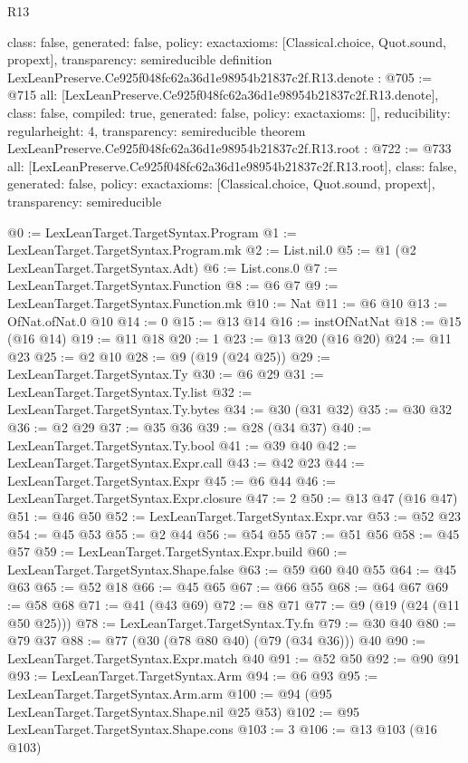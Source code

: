 \begin{lexlean}{R13}
\begin{coremodule}
{  class: false,
  generated: false,
  policy: exact{axioms: [Classical.choice, Quot.sound, propext]},
  transparency: semireducible
}
definition LexLeanPreserve.Ce925f048fc62a36d1e98954b21837c2f.R13.denote : @705 := @715 {
  all: [LexLeanPreserve.Ce925f048fc62a36d1e98954b21837c2f.R13.denote],
  class: false,
  compiled: true,
  generated: false,
  policy: exact{axioms: []},
  reducibility: regular{height: 4},
  transparency: semireducible
}
theorem LexLeanPreserve.Ce925f048fc62a36d1e98954b21837c2f.R13.root : @722 := @733 {
  all: [LexLeanPreserve.Ce925f048fc62a36d1e98954b21837c2f.R13.root],
  class: false,
  generated: false,
  policy: exact{axioms: [Classical.choice, Quot.sound, propext]},
  transparency: semireducible
}

@0 := LexLeanTarget.TargetSyntax.Program
@1 := LexLeanTarget.TargetSyntax.Program.mk
@2 := List.nil.{0}
@5 := @1 (@2 LexLeanTarget.TargetSyntax.Adt)
@6 := List.cons.{0}
@7 := LexLeanTarget.TargetSyntax.Function
@8 := @6 @7
@9 := LexLeanTarget.TargetSyntax.Function.mk
@10 := Nat
@11 := @6 @10
@13 := OfNat.ofNat.{0} @10
@14 := 0
@15 := @13 @14
@16 := instOfNatNat
@18 := @15 (@16 @14)
@19 := @11 @18
@20 := 1
@23 := @13 @20 (@16 @20)
@24 := @11 @23
@25 := @2 @10
@28 := @9 (@19 (@24 @25))
@29 := LexLeanTarget.TargetSyntax.Ty
@30 := @6 @29
@31 := LexLeanTarget.TargetSyntax.Ty.list
@32 := LexLeanTarget.TargetSyntax.Ty.bytes
@34 := @30 (@31 @32)
@35 := @30 @32
@36 := @2 @29
@37 := @35 @36
@39 := @28 (@34 @37)
@40 := LexLeanTarget.TargetSyntax.Ty.bool
@41 := @39 @40
@42 := LexLeanTarget.TargetSyntax.Expr.call
@43 := @42 @23
@44 := LexLeanTarget.TargetSyntax.Expr
@45 := @6 @44
@46 := LexLeanTarget.TargetSyntax.Expr.closure
@47 := 2
@50 := @13 @47 (@16 @47)
@51 := @46 @50
@52 := LexLeanTarget.TargetSyntax.Expr.var
@53 := @52 @23
@54 := @45 @53
@55 := @2 @44
@56 := @54 @55
@57 := @51 @56
@58 := @45 @57
@59 := LexLeanTarget.TargetSyntax.Expr.build
@60 := LexLeanTarget.TargetSyntax.Shape.false
@63 := @59 @60 @40 @55
@64 := @45 @63
@65 := @52 @18
@66 := @45 @65
@67 := @66 @55
@68 := @64 @67
@69 := @58 @68
@71 := @41 (@43 @69)
@72 := @8 @71
@77 := @9 (@19 (@24 (@11 @50 @25)))
@78 := LexLeanTarget.TargetSyntax.Ty.fn
@79 := @30 @40
@80 := @79 @37
@88 := @77 (@30 (@78 @80 @40) (@79 (@34 @36))) @40
@90 := LexLeanTarget.TargetSyntax.Expr.match @40
@91 := @52 @50
@92 := @90 @91
@93 := LexLeanTarget.TargetSyntax.Arm
@94 := @6 @93
@95 := LexLeanTarget.TargetSyntax.Arm.arm
@100 := @94 (@95 LexLeanTarget.TargetSyntax.Shape.nil @25 @53)
@102 := @95 LexLeanTarget.TargetSyntax.Shape.cons
@103 := 3
@106 := @13 @103 (@16 @103)

\end{coremodule}
\end{lexlean}
